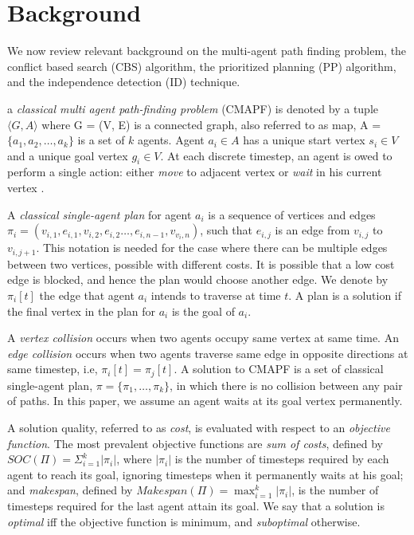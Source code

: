 \documentclass[letterpaper]{article} %
\def\
UrlFont{\rm}  %
\newcommand{\plan}[1]{\textbf{[\color{blue}PLAN:#1]}}
\theoremstyle{definition}
\begin{document}





\section{Background}

We now review relevant background on the multi-agent path finding problem, the conflict based search (CBS) algorithm, the prioritized planning (PP) algorithm, and the independence detection (ID) technique.

a \emph{classical multi agent path-finding problem} (CMAPF) is denoted by a tuple $\langle G, A \rangle$ where G = (V, E) is a connected graph, also referred to as map, A = $\{a_1, a_2, \ldots, a_k\}$ is a set of $k$ agents. Agent $a_i\in A$ has a unique start vertex $s_i \in V$ and a unique goal vertex $g_i \in V$. At each discrete timestep, an agent is owed to perform a single action: either \emph{move} to adjacent vertex or \emph{wait} in his current vertex \cite{stern2019overiew}.

A \emph{classical single-agent plan} for agent $a_i$ is a sequence of vertices and edges $\pi_{i} = (v_{i,1}, e_{i,1}, v_{i,2},  e_{i,2} \ldots,  e_{i,n-1}, v_{v_i,n})$, such that $e_{i,j}$ is an edge from $v_{i,j}$ to $v_{i,j+1}$. This notation is needed for the case where there can be multiple edges between two vertices, possible with different costs. It is possible that a low cost edge is blocked, and hence the plan would choose another edge. We denote by $\pi_{i}[t]$ the edge that agent $a_{i}$ intends to traverse at time $t$. A plan is a solution if the final vertex in the plan for $a_i$ is the goal of $a_i$.

A \emph{vertex collision} occurs when two agents occupy same vertex at same time. An \emph{edge collision} occurs when two agents traverse same edge in opposite directions at same timestep, i.e, $\pi_{i}[t] = \pi_{j}[t]$. A solution to CMAPF is a set of classical single-agent plan, $\pi=\{\pi_1,\ldots,\pi_k\}$, in which there is no collision between any pair of paths. In this paper, we assume an agent waits at its goal vertex permanently.

A solution quality, referred to as \emph{cost}, is evaluated with respect to an \emph{objective function}. The most prevalent objective functions are \emph{sum of costs}, defined by $ SOC(\Pi)=\Sigma_{i=1}^{k} |\pi_{i}| $, where $|\pi_{i}|$ is the number of timesteps required by each agent to reach its goal, ignoring timesteps when it permanently waits at his goal; and \emph{makespan}, defined by $Makespan(\Pi)=\max_{i=1}^{k}|\pi_{i}|$, is the number of timesteps required for the last agent attain its goal. We say that a solution is \emph{optimal} iff the objective function is minimum, and \emph{suboptimal} otherwise.
\end{document}
